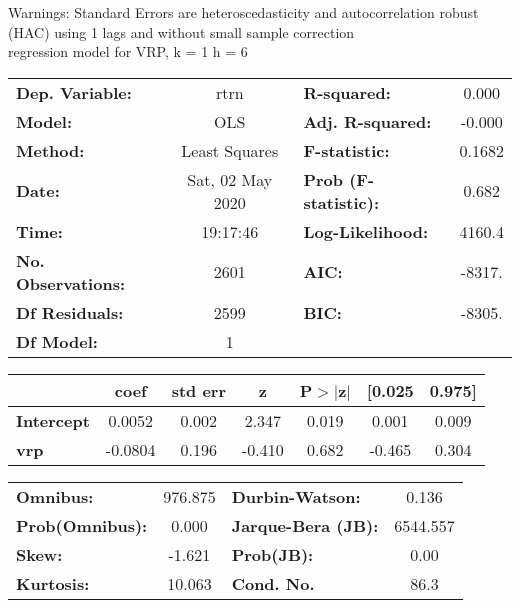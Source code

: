 Warnings: \newline
 [1] Standard Errors are heteroscedasticity and autocorrelation robust (HAC) using 1 lags and without small sample correction\\ 

regression model for VRP, k = 1 h = 6\begin{center}
\begin{tabular}{lclc}
\toprule
\textbf{Dep. Variable:}    &       rtrn       & \textbf{  R-squared:         } &     0.000   \\
\textbf{Model:}            &       OLS        & \textbf{  Adj. R-squared:    } &    -0.000   \\
\textbf{Method:}           &  Least Squares   & \textbf{  F-statistic:       } &    0.1682   \\
\textbf{Date:}             & Sat, 02 May 2020 & \textbf{  Prob (F-statistic):} &    0.682    \\
\textbf{Time:}             &     19:17:46     & \textbf{  Log-Likelihood:    } &    4160.4   \\
\textbf{No. Observations:} &        2601      & \textbf{  AIC:               } &    -8317.   \\
\textbf{Df Residuals:}     &        2599      & \textbf{  BIC:               } &    -8305.   \\
\textbf{Df Model:}         &           1      & \textbf{                     } &             \\
\bottomrule
\end{tabular}
\begin{tabular}{lcccccc}
                   & \textbf{coef} & \textbf{std err} & \textbf{z} & \textbf{P$> |$z$|$} & \textbf{[0.025} & \textbf{0.975]}  \\
\midrule
\textbf{Intercept} &       0.0052  &        0.002     &     2.347  &         0.019        &        0.001    &        0.009     \\
\textbf{vrp}       &      -0.0804  &        0.196     &    -0.410  &         0.682        &       -0.465    &        0.304     \\
\bottomrule
\end{tabular}
\begin{tabular}{lclc}
\textbf{Omnibus:}       & 976.875 & \textbf{  Durbin-Watson:     } &    0.136  \\
\textbf{Prob(Omnibus):} &   0.000 & \textbf{  Jarque-Bera (JB):  } & 6544.557  \\
\textbf{Skew:}          &  -1.621 & \textbf{  Prob(JB):          } &     0.00  \\
\textbf{Kurtosis:}      &  10.063 & \textbf{  Cond. No.          } &     86.3  \\
\bottomrule
\end{tabular}
\end{center}

